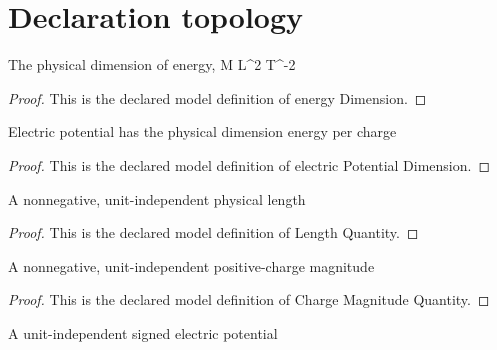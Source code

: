 \section{Declaration topology}
\begin{definition}
  \label{def:physics:phyx-mini-0858:phyxminiproblems-problemphyxmini0858-energydimension}
  The physical dimension of energy, M L\textasciicircum{}2 T\textasciicircum{}-2
\end{definition}
\begin{proof}
  This is the declared model definition of energy Dimension.
\end{proof}
\begin{definition}
  \label{def:physics:phyx-mini-0858:phyxminiproblems-problemphyxmini0858-electricpotentialdimension}
  Electric potential has the physical dimension energy per charge
\end{definition}
\begin{proof}
  This is the declared model definition of electric Potential Dimension.
\end{proof}
\begin{definition}
  \label{def:physics:phyx-mini-0858:phyxminiproblems-problemphyxmini0858-lengthquantity}
  A nonnegative, unit-independent physical length
\end{definition}
\begin{proof}
  This is the declared model definition of Length Quantity.
\end{proof}
\begin{definition}
  \label{def:physics:phyx-mini-0858:phyxminiproblems-problemphyxmini0858-chargemagnitudequantity}
  A nonnegative, unit-independent positive-charge magnitude
\end{definition}
\begin{proof}
  This is the declared model definition of Charge Magnitude Quantity.
\end{proof}
\begin{definition}
  \label{def:physics:phyx-mini-0858:phyxminiproblems-problemphyxmini0858-electricpotentialquantity}
  A unit-independent signed electric potential
\end{definition}
